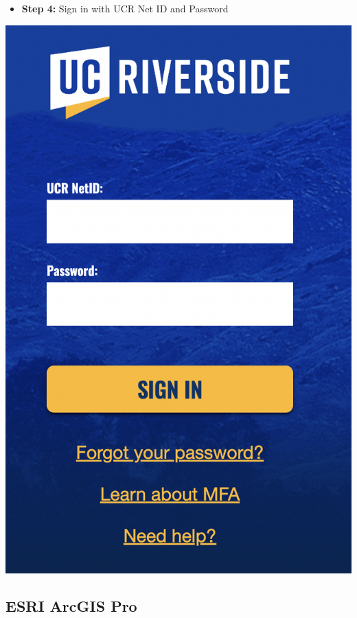 \documentclass[
]{book}
\providecommand{\tightlist}{%
  \setlength{\itemsep}{0pt}\setlength{\parskip}{0pt}}
\begin{document}
\begin{itemize}
\tightlist
\item
  \textbf{Step 4:} Sign in with UCR Net ID and Password
\end{itemize}

\begin{center}\includegraphics{images/esri_ucrid} \end{center}

\hypertarget{esri-arcgis-pro}{%
\subsection{ESRI ArcGIS Pro}\label{esri-arcgis-pro}}
\end{document}
